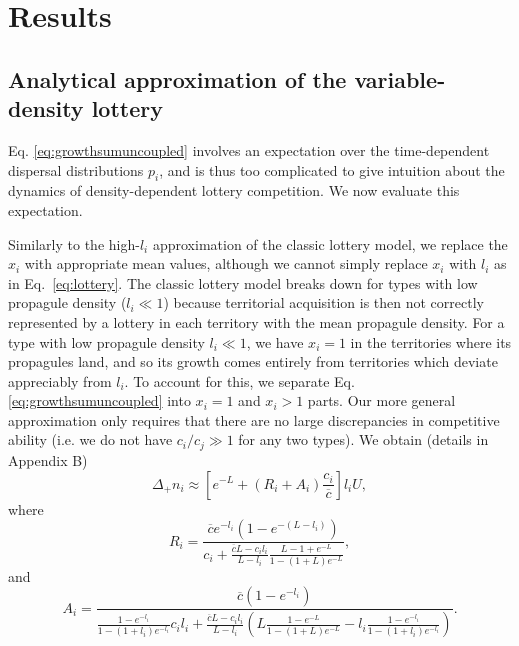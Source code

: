 \documentclass[12pt]{article}
\begin{document}
\section*{Results}

\subsection*{Analytical approximation of the variable-density lottery}

Eq. \eqref{eq:growthsumuncoupled} involves an expectation over the time-dependent dispersal distributions $p_i$, and is thus too complicated to give intuition about the dynamics of density-dependent lottery competition. We now evaluate this expectation. 

Similarly to the high-$l_i$ approximation of the classic lottery model, we replace the $x_i$ with appropriate mean values, although we cannot simply replace $x_i$ with $l_i$ as in Eq.~\eqref{eq:lottery}. The classic lottery model breaks down for types with low propagule density ($l_i\ll 1$) because territorial acquisition is then not correctly represented by a lottery in each territory with the mean propagule density. For a type with low propagule density $l_i\ll 1$, we have $x_i=1$ in the territories where its propagules land, and so its growth comes entirely from territories which deviate appreciably from $l_i$. To account for this, we separate Eq. \eqref{eq:growthsumuncoupled} into $x_i=1$ and $x_i>1$ parts. Our more general approximation only requires that there are no large discrepancies in competitive ability (i.e. we do not have $c_i/c_j\gg 1$ for any two types). We obtain (details in Appendix B)
\begin{equation}
\Delta_+ n_i\approx \left[e^{-L}+(R_i+A_i)\frac{c_i}{\overline{c}}\right]l_i U, \label{eq:master}
\end{equation}
where
\begin{equation}
R_i=\frac{\overline{c}e^{-l_i}(1-e^{-(L-l_i)})}{c_i +\frac{\overline{c}L- c_il_i}{L-l_i}\frac{L-1+e^{-L}}{1-(1+L)e^{-L}}},\nonumber \label{eq:Dr}
\end{equation}
and
\begin{equation}
A_i=\frac{\overline{c}(1-e^{-l_i})}{\frac{1-e^{-l_i}}{1-(1+l_i)e^{-l_i}}c_il_i+\frac{\overline{c}L- c_il_i}{L-l_i}\left(L\frac{1-e^{-L}}{1-(1+L)e^{-L}}-l_i\frac{1-e^{-l_i}}{1-(1+l_i)e^{-l_i}}\right)}. \nonumber \label{eq:Da}
\end{equation}
\end{document}
